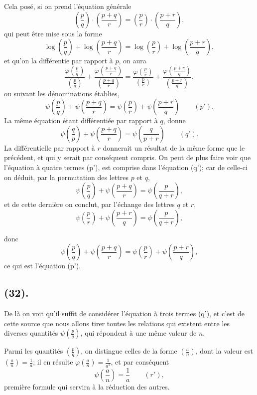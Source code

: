 \documentclass{article}
\begin{document}
Cela posé, si on prend l'équation générale
\[ \left(\frac{p}{q}\right)\cdot\left(\frac{p+q}{r}\right)=\left(\frac{p}{r}\right)\cdot\left(\frac{p+r}{q}\right), \]
qui peut être mise sous la forme
\[ \log\left(\frac{p}{q}\right)+\log\left(\frac{p+q}{r}\right)=\log\left(\frac{p}{r}\right)+\log\left(\frac{p+r}{q}\right), \]
et qu'on la différentie par rapport à $p$, on aura
\[ \frac{\varphi\left(\frac{p}{q}\right)}{\left(\frac{p}{q}\right)}+\frac{\varphi\left(\frac{p+q}{r}\right)}{\left(\frac{p+q}{r}\right)}=\frac{\varphi\left(\frac{p}{r}\right)}{\left(\frac{p}{r}\right)}+\frac{\varphi\left(\frac{p+r}{q}\right)}{\left(\frac{p+r}{q}\right)}, \]
ou suivant les dénominations établies,
\[ \psi\left(\frac{p}{q}\right)+\psi\left(\frac{p+q}{r}\right)=\psi\left(\frac{p}{r}\right)+\psi\left(\frac{p+r}{q}\right)\qquad(p'). \]
La même équation étant différentiée par rapport à $q$, donne
\[ \psi\left(\frac{q}{p}\right)+\psi\left(\frac{p+q}{r}\right)=\psi\left(\frac{q}{p+r}\right)\qquad(q'). \]
La différentielle par rapport à $r$ donnerait un résultat de la même forme que le précédent, et qui y serait par conséquent compris. On peut de plus faire voir que l'équation à quatre termes (p'), est comprise dans l'équation (q'); car de celle-ci on déduit, par la permutation des lettres $p$ et $q$,
\[ \psi\left(\frac{p}{q}\right)+\psi\left(\frac{p+q}{r}\right)=\psi\left(\frac{p}{q+r}\right), \]
et de cette dernière on conclut, par l'échange des lettres $q$ et $r$,
\[ \psi\left(\frac{p}{r}\right)+\psi\left(\frac{p+r}{q}\right)=\psi\left(\frac{p}{q+r}\right), \]

donc
\[ \psi\left(\frac{p}{q}\right)+\psi\left(\frac{p+q}{r}\right)=\psi\left(\frac{p}{r}\right)+\psi\left(\frac{p+r}{q}\right), \]
ce qui est l'équation (p').

\subsection*{(32).}

De là on voit qu'il suffit de considérer l'équation à trois termes (q'), et c'est de cette source que nous allons tirer toutes les relations qui existent entre les diverses quantités $\psi\left(\frac{p}{q}\right)$, qui répondent à une même valeur de $n$.

Parmi les quantités $\left(\frac{p}{q}\right)$, on distingue celles de la forme $\left(\frac{a}{n}\right)$, dont la valeur est $\left(\frac{a}{n}\right)=\frac{1}{a}$; il en résulte $\varphi\left(\frac{a}{n}\right)=\frac{1}{a^{2}}$, et par conséquent
\[ \psi\left(\frac{a}{n}\right)=\frac{1}{a}\qquad(r'), \]
première formule qui servira à la réduction des autres.
\end{document}
